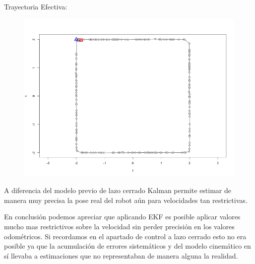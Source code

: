 Trayectoria Efectiva:

\begin{figure}[!htb]
\begin{center}
\includegraphics[width=\linewidth/2]{imagenesTrayectorias/ekf/ekf4.png}
\end{center}
\end{figure}
\FloatBarrier




A diferencia del modelo previo de lazo cerrado Kalman permite estimar de manera muy precisa la pose real del robot aún para velocidades tan restrictivas.

En conclusión podemos apreciar que aplicando EKF es posible aplicar valores mucho mas restrictivos sobre la velocidad sin perder precisión en los valores odométricos. Si recordamos en el apartado de control a lazo cerrado esto no era posible ya que la acumulación de errores sistemáticos y del modelo cinemático en sí llevaba a estimaciones que no representaban de manera alguna la realidad.



